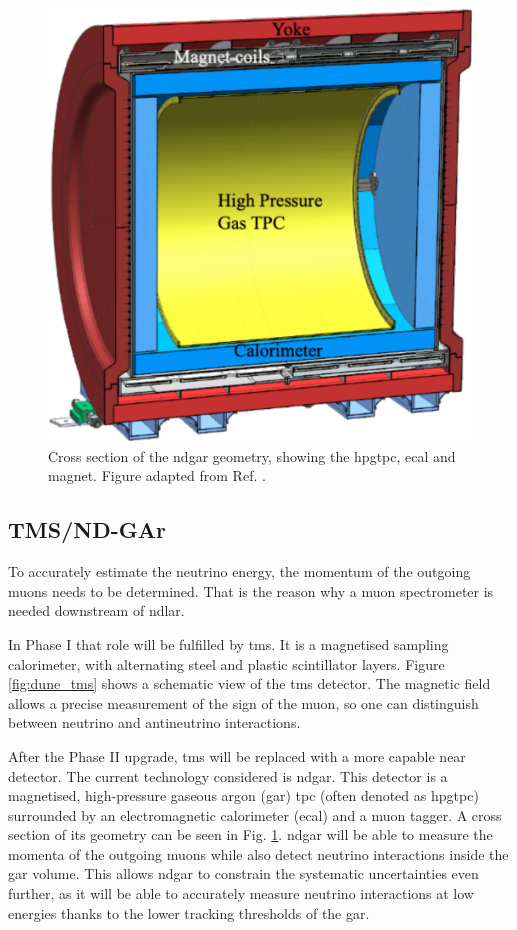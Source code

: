 \begin{figure}[t]
	\centering
	\includegraphics[width=0.45\linewidth]{Images/DUNE/ND/nd_gar}
	\caption[Cross section of the \gls{ndgar} geometry, showing the \gls{hpgtpc}, \gls{ecal} and magnet.]{Cross section of the \gls{ndgar} geometry, showing the \gls{hpgtpc}, \gls{ecal} and magnet. Figure adapted from Ref. \cite{DUNE2024Phase2}.}
	\label{fig:dune_nd_gar}
\end{figure}

\subsection{TMS/ND-GAr}

To accurately estimate the neutrino energy, the momentum of the outgoing muons needs to be determined. That is the reason why a muon spectrometer is needed downstream of \gls{ndlar}.

In Phase I that role will be fulfilled by \gls{tms}. It is a magnetised sampling calorimeter, with alternating steel and plastic scintillator layers. Figure \ref{fig:dune_tms} shows a schematic view of the \gls{tms} detector. The magnetic field allows a precise measurement of the sign of the muon, so one can distinguish between neutrino and antineutrino interactions.

After the Phase II upgrade, \gls{tms} will be replaced with a more capable near detector. The current technology considered is \gls{ndgar}. This detector is a magnetised, high-pressure gaseous argon (\gls{gar}) \gls{tpc} (often denoted as \gls{hpgtpc}) surrounded by an electromagnetic calorimeter (\gls{ecal}) and a muon tagger. A cross section of its geometry can be seen in Fig. \ref{fig:dune_nd_gar}. \gls{ndgar} will be able to measure the momenta of the outgoing muons while also detect neutrino interactions inside the \gls{gar} volume. This allows \gls{ndgar} to constrain the systematic uncertainties even further, as it will be able to accurately measure neutrino interactions at low energies thanks to the lower tracking thresholds of the \gls{gar}.

